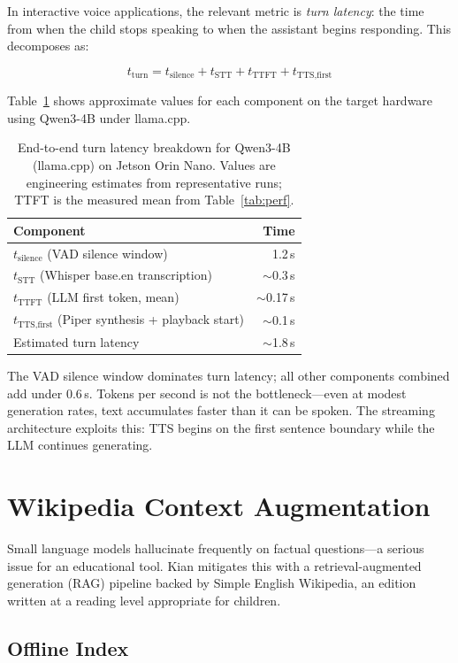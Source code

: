 \documentclass[11pt]{article}
\begin{document}
In interactive voice applications, the relevant metric is \emph{turn latency}:
the time from when the child stops speaking to when the assistant begins responding.
This decomposes as:

$$t_{\text{turn}} = t_{\text{silence}} + t_{\text{STT}} + t_{\text{TTFT}} + t_{\text{TTS,first}}$$

\noindent Table~\ref{tab:latency} shows approximate values for each component on the target hardware using Qwen3-4B under llama.cpp.

\begin{table}[H]
\centering
\begin{tabular}{lr}
\toprule
Component & Time \\
\midrule
$t_{\text{silence}}$ (VAD silence window) & 1.2\,s \\
$t_{\text{STT}}$ (Whisper base.en transcription) & $\sim$0.3\,s \\
$t_{\text{TTFT}}$ (LLM first token, mean) & $\sim$0.17\,s \\
$t_{\text{TTS,first}}$ (Piper synthesis + playback start) & $\sim$0.1\,s \\
\midrule
Estimated turn latency & $\sim$1.8\,s \\
\bottomrule
\end{tabular}
\caption{End-to-end turn latency breakdown for Qwen3-4B (llama.cpp) on Jetson Orin Nano.
Values are engineering estimates from representative runs;
TTFT is the measured mean from Table~\ref{tab:perf}.}
\label{tab:latency}
\end{table}

\noindent The VAD silence window dominates turn latency;
all other components combined add under 0.6\,s.
Tokens per second is not the bottleneck---even at modest generation rates, text accumulates faster than it can be spoken.
The streaming architecture exploits this:
TTS begins on the first sentence boundary while the LLM continues generating.

\section{Wikipedia Context Augmentation}

Small language models hallucinate frequently on factual questions---a serious issue for an educational tool.
Kian mitigates this with a retrieval-augmented generation (RAG) pipeline backed by Simple English Wikipedia, an edition written at a reading level appropriate for children.

\subsection{Offline Index}
\end{document}
